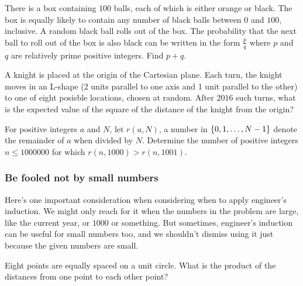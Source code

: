\documentclass[11pt,paper=letter]{scrartcl}
\begin{document}
\begin{mdframed}[style=exmdbox]

\begin{problem}
  There is a box containing $100$ balls, each of which is either orange or black. The box is equally likely to contain any number of black balls between $0$ and $100$, inclusive. A random black ball rolls out of the box. The probability that the next ball to roll out of the box is also black can be written in the form $\frac pq$ where $p$ and $q$ are relatively prime positive integers. Find $p + q$.
\end{problem}

\begin{problem}
  A knight is placed at the origin of the Cartesian plane. Each turn, the knight moves in an L-shape (2 units parallel to one axis and 1 unit parallel to the other) to one of eight posisble locations, chosen at random. After $2016$ such turns, what is the expected value of the square of the distance of the knight from the origin?
\end{problem}

\begin{problem}
  For positive integers $a$ and $N$, let $r(a, N)$, a number in $\left\{ 0, 1, \ldots, N-1 \right\}$ denote the remainder of $a$ when divided by $N$. Determine the number of positive integers $n \leq 1000000$ for which $r(n, 1000) > r(n, 1001)$. \hint{\ref{h:1}}
\end{problem}

\end{mdframed}

\subsubsection{Be fooled not by small numbers}

Here's one important consideration when considering when to apply engineer's induction. We might only reach for it when the numbers in the problem are large, like the current year, or $1000$ or something. But sometimes, engineer's induction can be useful for small numbers too, and we shouldn't dismiss using it just because the given numbers are small. 

\begin{exboxed}
Eight points are equally spaced on a unit circle. What is the product of the distances from one point to each other point?
\end{exboxed}
\end{document}
